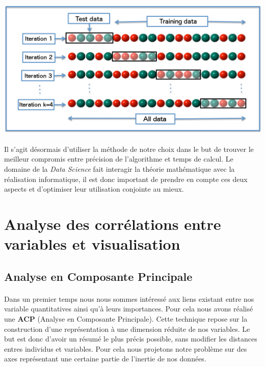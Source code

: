 \documentclass[14pt, openany]{article}
\begin{document}
\paragraph{}
\includegraphics[width=17cm]{Images/k_fold.jpg}
\begin{center}
\label{fig1}
\end{center}
\paragraph{}
Il s'agit désormais d'utiliser la méthode de notre choix dans le but de trouver le meilleur compromis entre précision de l'algorithme et temps de calcul. Le domaine de la \textit{Data Science} fait interagir la théorie mathématique avec la réalisation informatique, il est donc important de prendre en compte ces deux aspects et d'optimiser leur utilisation conjointe au mieux.
\section{Analyse des corrélations entre variables et visualisation}

\subsection{Analyse en Composante Principale}

\paragraph{}
Dans un premier temps nous nous sommes intéressé aux liens existant entre nos variable quantitatives ainsi qu'à leurs importances. Pour cela nous avons réalisé une \textbf{ACP} (Analyse en Composante Principale). Cette technique repose sur la construction d'une représentation à une dimension réduite de nos variables. Le but est donc d'avoir un résumé le plus précis possible, sans modifier les distances entres individus et variables. Pour cela nous projetons notre problème sur des axes représentant une certaine partie de l'inertie de nos données.
\end{document}
